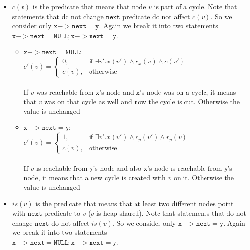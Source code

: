 \begin{itemize}
\begin{itemize}
\end{itemize}
\item $c(v)$ is the predicate that means that node $v$ is part of a cycle. Note that statements that do not change $\mathtt{next}$ predicate do not affect $c(v)$. So we consider only $\mathtt{x->next=y}$. Again we break it into two statements\\ $\mathtt{x->next=NULL; x->next=y}$.
\begin{itemize}
	\item $\mathtt{x->next=NULL}$:\\
	$c'(v)=\begin{cases}
	0, & \text{if } \exists v'.x(v')\land r_x(v)\land c(v') \\
	c(v), & \text{otherwise}
	\end{cases}$\\ \\
	If $v$ was reachable from $\mathtt{x}$'s node and $\mathtt{x}$'s node was on a cycle, it means that $v$ was on that cycle as well and now the cycle is cut. Otherwise the value is unchanged \\
	\item $\mathtt{x->next=y}$:\\
	$c'(v)=\begin{cases}
	1, & \text{if } \exists v'.x(v')\land r_y(v')\land r_y(v) \\
	c(v), & \text{otherwise}
	\end{cases}$\\ \\
	If $v$ is reachable from $\mathtt{y}$'s node and also $\mathtt{x}$'s node is reachable from $\mathtt{y}$'s node, it means that a new cycle is created with $v$ on it. Otherwise the value is unchanged \\
\end{itemize}
\item $is(v)$ is the predicate that means that at least two different nodes point with $\mathtt{next}$ predicate to $v$ ($v$ is heap-shared). Note that statements that do not change $\mathtt{next}$ do not affect $is(v)$. So we consider only $\mathtt{x->next=y}$. Again we break it into two statements\\ $\mathtt{x->next=NULL; x->next=y}$.
\end{itemize}
